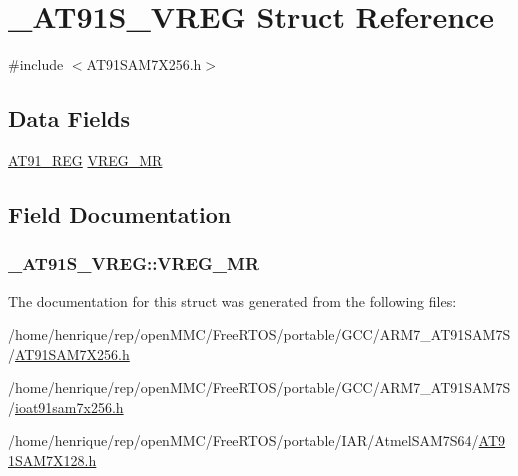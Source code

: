 \hypertarget{struct__AT91S__VREG}{\section{\-\_\-\-A\-T91\-S\-\_\-\-V\-R\-E\-G Struct Reference}
\label{struct__AT91S__VREG}
}


{\ttfamily \#include $<$A\-T91\-S\-A\-M7\-X256.\-h$>$}

\subsection*{Data Fields}
\begin{DoxyCompactItemize}
\item 
\hyperlink{GCC_2ARM7__AT91SAM7S_2AT91SAM7X256_8h_a712ad5a1ac1bd02f3e95a7526c283ce1}{A\-T91\-\_\-\-R\-E\-G} \hyperlink{struct__AT91S__VREG_a4038fa85997d02d123dc853675692c58}{V\-R\-E\-G\-\_\-\-M\-R}
\end{DoxyCompactItemize}


\subsection{Field Documentation}
\hypertarget{struct__AT91S__VREG_a4038fa85997d02d123dc853675692c58}{
\subsubsection[{V\-R\-E\-G\-\_\-\-M\-R}]{ \-\_\-\-A\-T91\-S\-\_\-\-V\-R\-E\-G\-::\-V\-R\-E\-G\-\_\-\-M\-R}}\label{struct__AT91S__VREG_a4038fa85997d02d123dc853675692c58}


The documentation for this struct was generated from the following files\-:\begin{DoxyCompactItemize}
\item 
/home/henrique/rep/open\-M\-M\-C/\-Free\-R\-T\-O\-S/portable/\-G\-C\-C/\-A\-R\-M7\-\_\-\-A\-T91\-S\-A\-M7\-S/\hyperlink{GCC_2ARM7__AT91SAM7S_2AT91SAM7X256_8h}{A\-T91\-S\-A\-M7\-X256.\-h}\item 
/home/henrique/rep/open\-M\-M\-C/\-Free\-R\-T\-O\-S/portable/\-G\-C\-C/\-A\-R\-M7\-\_\-\-A\-T91\-S\-A\-M7\-S/\hyperlink{ioat91sam7x256_8h}{ioat91sam7x256.\-h}\item 
/home/henrique/rep/open\-M\-M\-C/\-Free\-R\-T\-O\-S/portable/\-I\-A\-R/\-Atmel\-S\-A\-M7\-S64/\hyperlink{AT91SAM7X128_8h}{A\-T91\-S\-A\-M7\-X128.\-h}\end{DoxyCompactItemize}
